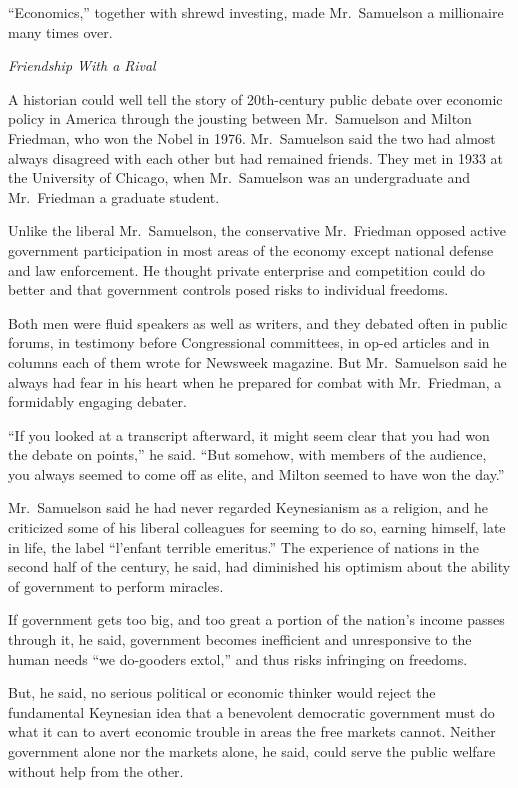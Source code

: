 ﻿\documentclass[12pt]{article}
\begin{document}
``Economics,'' together with shrewd investing, made Mr.~Samuelson a millionaire many times over.

\emph{Friendship With a Rival}

A historian could well tell the story of 20th-century public debate over economic policy in America
through the jousting between Mr.~Samuelson and Milton Friedman, who won the Nobel in 1976.
Mr.~Samuelson said the two had almost always disagreed with each other but had remained friends.
They met in 1933 at the University of Chicago, when Mr.~Samuelson was an undergraduate and
Mr.~Friedman a graduate student.

Unlike the liberal Mr.~Samuelson, the conservative Mr.~Friedman opposed active government
participation in most areas of the economy except national defense and law enforcement. He thought
private enterprise and competition could do better and that government controls posed risks to
individual freedoms.

Both men were fluid speakers as well as writers, and they debated often in public forums, in
testimony before Congressional committees, in op-ed articles and in columns each of them wrote for
Newsweek magazine. But Mr.~Samuelson said he always had fear in his heart when he prepared for
combat with Mr.~Friedman, a formidably engaging debater.

``If you looked at a transcript afterward, it might seem clear that you had won the debate on
points,'' he said. ``But somehow, with members of the audience, you always seemed to come off as
elite, and Milton seemed to have won the day.''

Mr.~Samuelson said he had never regarded Keynesianism as a religion, and he criticized some of his
liberal colleagues for seeming to do so, earning himself, late in life, the label ``l'enfant
terrible emeritus.'' The experience of nations in the second half of the century, he said, had
diminished his optimism about the ability of government to perform miracles.

If government gets too big, and too great a portion of the nation's income passes through it, he
said, government becomes inefficient and unresponsive to the human needs ``we do-gooders extol,''
and thus risks infringing on freedoms.

But, he said, no serious political or economic thinker would reject the fundamental Keynesian idea
that a benevolent democratic government must do what it can to avert economic trouble in areas the
free markets cannot. Neither government alone nor the markets alone, he said, could serve the public
welfare without help from the other.
\end{document}
